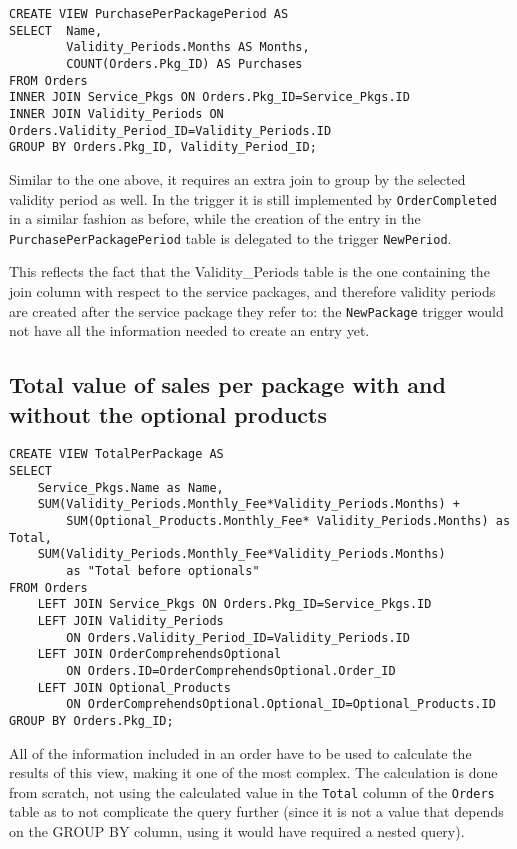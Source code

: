 \begin{lstlisting}[style=SQL]
CREATE VIEW PurchasePerPackagePeriod AS
SELECT  Name,
        Validity_Periods.Months AS Months,
        COUNT(Orders.Pkg_ID) AS Purchases
FROM Orders
INNER JOIN Service_Pkgs ON Orders.Pkg_ID=Service_Pkgs.ID
INNER JOIN Validity_Periods ON Orders.Validity_Period_ID=Validity_Periods.ID
GROUP BY Orders.Pkg_ID, Validity_Period_ID;
\end{lstlisting}

Similar to the one above, it requires an extra join to group by the selected validity period as well. In the trigger it is still implemented by \texttt{OrderCompleted} in a similar fashion as before, while the creation of the entry in the \texttt{PurchasePerPackagePeriod} table is delegated to the trigger \texttt{NewPeriod}.

This reflects the fact that the Validity\_Periods table is the one containing the join column with respect to the service packages, and therefore validity periods are created after the service package they refer to: the \texttt{NewPackage} trigger would not have all the information needed to create an entry yet.

\subsection{Total value of sales per package with and without the optional products}

\begin{lstlisting}[style=SQL]
CREATE VIEW TotalPerPackage AS
SELECT
    Service_Pkgs.Name as Name,
    SUM(Validity_Periods.Monthly_Fee*Validity_Periods.Months) +
        SUM(Optional_Products.Monthly_Fee* Validity_Periods.Months) as Total,
    SUM(Validity_Periods.Monthly_Fee*Validity_Periods.Months)
        as "Total before optionals"
FROM Orders
    LEFT JOIN Service_Pkgs ON Orders.Pkg_ID=Service_Pkgs.ID
    LEFT JOIN Validity_Periods
        ON Orders.Validity_Period_ID=Validity_Periods.ID
    LEFT JOIN OrderComprehendsOptional
        ON Orders.ID=OrderComprehendsOptional.Order_ID
    LEFT JOIN Optional_Products
        ON OrderComprehendsOptional.Optional_ID=Optional_Products.ID
GROUP BY Orders.Pkg_ID;

\end{lstlisting}

All of the information included in an order have to be used to calculate the results of this view, making it one of the most complex. The calculation is done from scratch, not using the calculated value in the \texttt{Total}  column of the \texttt{Orders}  table as to not complicate the query further (since it is not a value that depends on the GROUP BY column, using it would have required a nested query).

